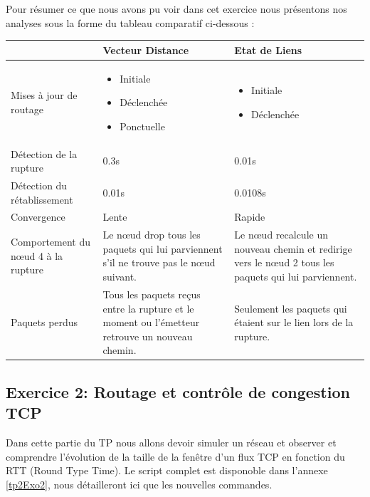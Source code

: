 \documentclass[11pt]{article}
\begin{document}
Pour résumer ce que nous avons pu voir dans cet exercice nous présentons nos analyses sous la forme du tableau comparatif ci-dessous :

\noindent
\begin{tabular}{|R{4cm}|M{5cm}|M{5cm}| }
    \hline
     					   & 
     	Vecteur Distance  &  
     	Etat de Liens 
 	\tabularnewline
    \hline
     	Mises à jour de routage & 
     	\begin{itemize}
     		\item Initiale
     		\item Déclenchée
     		\item Ponctuelle
		\end{itemize}  & 
		\begin{itemize}
			\item Initiale
			\item Déclenchée
		\end{itemize}	   
	\tabularnewline
    
    \hline 
    	Détection de la rupture & 
    	0.3s & 
    	0.01s 
    \tabularnewline
  
   	\hline 
   		Détection du rétablissement & 
   		0.01s & 
   		0.0108s 
   	\tabularnewline
   	
   	\hline 
   		Convergence &
   	 	Lente  & 
   	 	Rapide 
   	\tabularnewline
   	
   	\hline 
   		Comportement du nœud 4 à la rupture & 
   		Le nœud drop tous les paquets qui lui parviennent s’il ne trouve pas le nœud suivant. & 
   		Le nœud recalcule un nouveau chemin et redirige vers le nœud 2 tous les paquets qui lui parviennent. 
   	\tabularnewline
   	
   	\hline 
   		Paquets perdus  & 
   		Tous les paquets reçus entre la rupture et le moment ou l’émetteur retrouve un nouveau chemin. &
   		Seulement les paquets qui étaient sur le lien lors de la rupture. 
   	\tabularnewline
   	
   	\hline
\end{tabular}







\subsection{Exercice 2: Routage et contrôle de congestion TCP}

Dans cette partie du TP nous allons devoir simuler un réseau et observer et comprendre l’évolution de la taille de la fenêtre d’un flux TCP en fonction du RTT (Round Type Time). Le script complet est disponoble dans l'annexe \ref{tp2Exo2}, nous détailleront ici que les nouvelles commandes.\\
\end{document}
